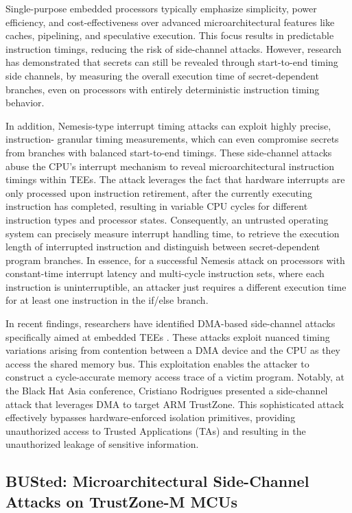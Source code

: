 Single-purpose embedded processors typically emphasize simplicity, power efficiency, and cost-effectiveness over advanced microarchitectural features like caches, pipelining, and speculative execution. This focus results in predictable instruction timings, reducing the risk of side-channel attacks. However, research \cite{Travis, brumley2005remote} has demonstrated that secrets can still be revealed through start-to-end timing side channels, by measuring the overall execution time of secret-dependent branches, even on processors with entirely deterministic instruction timing behavior. 

In addition, Nemesis-type interrupt timing attacks \cite{Nemesis} can
exploit highly precise, instruction- granular timing measurements, which
can even compromise secrets from branches with balanced start-to-end
timings. These side-channel attacks abuse the CPU's interrupt mechanism to
reveal microarchitectural instruction timings within \acp{TEE}. The attack leverages the fact that hardware interrupts are only processed upon instruction retirement, after the currently executing instruction has completed, resulting in variable CPU cycles for different instruction types and processor states. Consequently, an untrusted operating system can precisely measure interrupt handling time, to retrieve the execution length of interrupted instruction and distinguish between secret-dependent program branches. In essence, for a successful Nemesis attack on processors with constant-time interrupt latency and multi-cycle instruction sets, where each instruction is uninterruptible, an attacker just requires a different execution time for at least one instruction in the if/else branch.

In recent findings, researchers have identified DMA-based side-channel
attacks specifically aimed at embedded TEEs \cite{busted, marton}. These
attacks exploit nuanced timing variations arising from contention between a
DMA device and the CPU as they access the shared memory bus. This
exploitation enables the attacker to construct a cycle-accurate memory
access trace of a victim program. Notably, at the Black Hat Asia
conference, Cristiano Rodrigues presented a side-channel attack that
leverages DMA to target ARM TrustZone. This sophisticated attack
effectively bypasses hardware-enforced isolation primitives, providing
unauthorized access to Trusted Applications (\acp{TA}) and resulting in the unauthorized leakage of sensitive information.

\subsection{BUSted: Microarchitectural Side-Channel Attacks on TrustZone-M MCUs}

